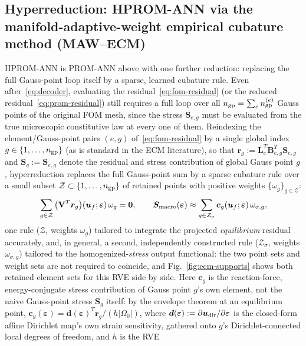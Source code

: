 \documentclass[10pt,a4paper]{article}
\begin{document}
\subsection{Hyperreduction: HPROM-ANN via the manifold-adaptive-weight empirical cubature method (MAW--ECM)}
\label{sec:background-ecm}
HPROM-ANN is PROM-ANN above with one further reduction: replacing the
full Gauss-point loop itself by a sparse, learned cubature rule. Even
after~\eqref{eq:decoder}, evaluating the residual~\eqref{eq:fom-residual}
(or the reduced residual~\eqref{eq:prom-residual}) still requires a full
loop over all $n_{\rm gp}=\sum_e n_{\rm gp}^{(e)}$ Gauss points of the
original FOM mesh, since the stress $\bm S_{e,g}$ must be evaluated from
the true microscopic constitutive law at every one of them. Reindexing the
element/Gauss-point pairs $(e,g)$ of~\eqref{eq:fom-residual} by a single
global index $g\in\{1,\dots,n_{\rm gp}\}$ (as is standard in the ECM
literature), so that $\bm r_g:=\bm L_e^T\bm B_{e,g}^T\bm S_{e,g}$ and
$\bm S_g:=\bm S_{e,g}$ denote the residual and stress contribution of
global Gauss point $g$, hyperreduction replaces the full Gauss-point sum
by a sparse cubature rule over a small subset $\mathcal
Z\subset\{1,\dots,n_{\rm gp}\}$ of retained points with positive weights
$\{\omega_g\}_{g\in\mathcal Z}$:
\begin{equation}
\label{eq:ecm-residual}
 \sum_{g\in\mathcal Z}\big(\mathbf V^T\bm r_g\big)(\bm u_f;\bm\varepsilon)\,\omega_g=\bm 0,
 \qquad
 \bm S_{\rm macro}(\bm\varepsilon)\approx\sum_{g\in\mathcal
 Z_\sigma}\bm c_g(\bm u_f;\bm\varepsilon)\,\omega_{\sigma,g},
\end{equation}
one rule ($\mathcal Z$, weights $\omega_g$) tailored to integrate the
projected \emph{equilibrium} residual accurately, and, in general, a second,
independently constructed rule ($\mathcal Z_\sigma$, weights
$\omega_{\sigma,g}$) tailored to the homogenized-\emph{stress} output
functional: the two point sets and weight sets are not required to
coincide, and Fig.~\ref{fig:ecm-supports} shows both retained element sets
for this RVE side by side. Here $\bm c_g$ is the reaction-force,
energy-conjugate stress contribution of Gauss point $g$'s own element,
not the naive Gauss-point stress $\bm S_g$ itself: by the envelope
theorem at an equilibrium point, $\bm c_g(\bm\varepsilon)=\bm
d(\bm\varepsilon)^T\bm r_g/(h|\Omega_0|)$, where $\bm
d(\bm\varepsilon):=\partial\bm u_{\rm dir}/\partial\bm\varepsilon$ is the
closed-form affine Dirichlet map's own strain sensitivity, gathered onto
$g$'s Dirichlet-connected local degrees of freedom, and $h$ is the RVE
\end{document}
